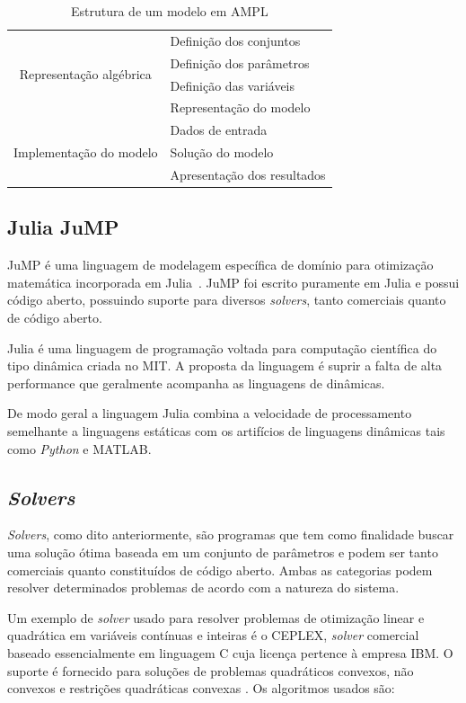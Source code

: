 \begin{table}[H]
    \centering
    \caption{Estrutura de um modelo em AMPL}
    \begin{tabular}{|c|l|}
        \hline
        \multirow{4}{*}{Representação algébrica} & Definição dos conjuntos\\ & Definição dos parâmetros\\ & Definição das variáveis\\ & Representação do modelo\\ \hline
        \multirow{3}{*}{Implementação do modelo} & Dados de entrada\\ & Solução do modelo\\ & Apresentação dos resultados\\
        \hline
    \end{tabular}
    \label{tab:estrut_AMPL}
\end{table}

\subsection{Julia JuMP}

JuMP é uma linguagem de modelagem específica de domínio para otimização matemática incorporada em Julia~\cite{DunningHuchetteLubin2017}.
JuMP foi escrito puramente em Julia e possui código aberto, possuindo suporte para diversos \emph{solvers}, tanto comerciais quanto de código aberto.

Julia é uma linguagem de programação voltada para computação científica do tipo dinâmica criada no MIT.
A proposta da linguagem é suprir a falta de alta performance que geralmente acompanha as linguagens de dinâmicas.

De modo geral a linguagem Julia combina a velocidade de processamento semelhante a linguagens estáticas com os artifícios de linguagens dinâmicas tais como \emph{Python} e MATLAB.

\subsection{\emph{Solvers}}

\emph{Solvers}, como dito anteriormente, são programas que tem como finalidade buscar uma solução ótima baseada em um conjunto de parâmetros e podem ser tanto comerciais quanto constituídos de código aberto.
Ambas as categorias podem resolver determinados problemas de acordo com a natureza do sistema.


Um exemplo de \emph{solver} usado para resolver problemas de otimização linear e quadrática em variáveis contínuas e inteiras é o CEPLEX, \emph{solver} comercial baseado essencialmente em linguagem C cuja licença pertence à empresa IBM.
O suporte é fornecido para soluções de problemas quadráticos convexos, não convexos e restrições quadráticas convexas \cite{amplCEPLEX}. Os algoritmos usados são:

